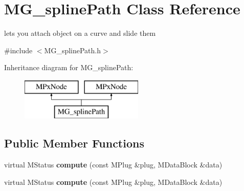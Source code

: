 \hypertarget{class_m_g__spline_path}{\section{M\-G\-\_\-spline\-Path Class Reference}
\label{class_m_g__spline_path}
}


lets you attach object on a curve and slide them  




{\ttfamily \#include $<$M\-G\-\_\-spline\-Path.\-h$>$}

Inheritance diagram for M\-G\-\_\-spline\-Path\-:\begin{figure}[H]
\begin{center}
\leavevmode
\includegraphics[height=2.000000cm]{class_m_g__spline_path}
\end{center}
\end{figure}
\subsection*{Public Member Functions}
\begin{DoxyCompactItemize}
\item 
\hypertarget{class_m_g__spline_path_a464608bab05012cf1ec3d4c1d30c12e3}{virtual M\-Status {\bfseries compute} (const M\-Plug \&plug, M\-Data\-Block \&data)}\label{class_m_g__spline_path_a464608bab05012cf1ec3d4c1d30c12e3}

\item 
\hypertarget{class_m_g__spline_path_a464608bab05012cf1ec3d4c1d30c12e3}{virtual M\-Status {\bfseries compute} (const M\-Plug \&plug, M\-Data\-Block \&data)}\label{class_m_g__spline_path_a464608bab05012cf1ec3d4c1d30c12e3}

\end{DoxyCompactItemize}
